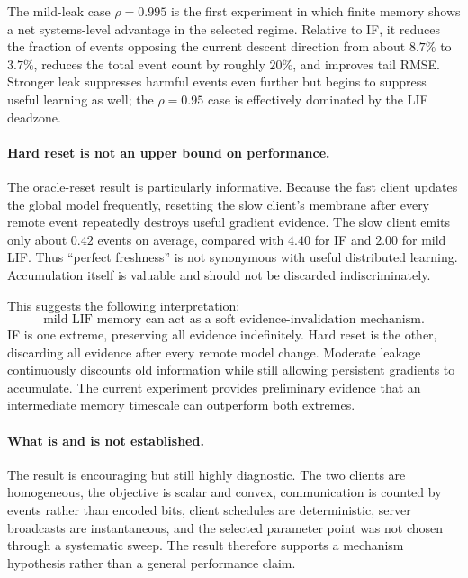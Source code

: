 The mild-leak case $\rho=0.995$ is the first experiment in which finite memory shows a net systems-level advantage in the selected regime. Relative to IF, it reduces the fraction of events opposing the current descent direction from about $8.7\%$ to $3.7\%$, reduces the total event count by roughly $20\%$, and improves tail RMSE. Stronger leak suppresses harmful events even further but begins to suppress useful learning as well; the $\rho=0.95$ case is effectively dominated by the LIF deadzone.

\paragraph{Hard reset is not an upper bound on performance.}
The oracle-reset result is particularly informative. Because the fast client updates the global model frequently, resetting the slow client's membrane after every remote event repeatedly destroys useful gradient evidence. The slow client emits only about $0.42$ events on average, compared with $4.40$ for IF and $2.00$ for mild LIF. Thus ``perfect freshness'' is not synonymous with useful distributed learning. Accumulation itself is valuable and should not be discarded indiscriminately.

This suggests the following interpretation:
\begin{equation}
  \boxed{\text{mild LIF memory can act as a soft evidence-invalidation mechanism}.}
\end{equation}
IF is one extreme, preserving all evidence indefinitely. Hard reset is the other, discarding all evidence after every remote model change. Moderate leakage continuously discounts old information while still allowing persistent gradients to accumulate. The current experiment provides preliminary evidence that an intermediate memory timescale can outperform both extremes.

\paragraph{What is and is not established.}
The result is encouraging but still highly diagnostic. The two clients are homogeneous, the objective is scalar and convex, communication is counted by events rather than encoded bits, client schedules are deterministic, server broadcasts are instantaneous, and the selected parameter point was not chosen through a systematic sweep. The result therefore supports a mechanism hypothesis rather than a general performance claim.

